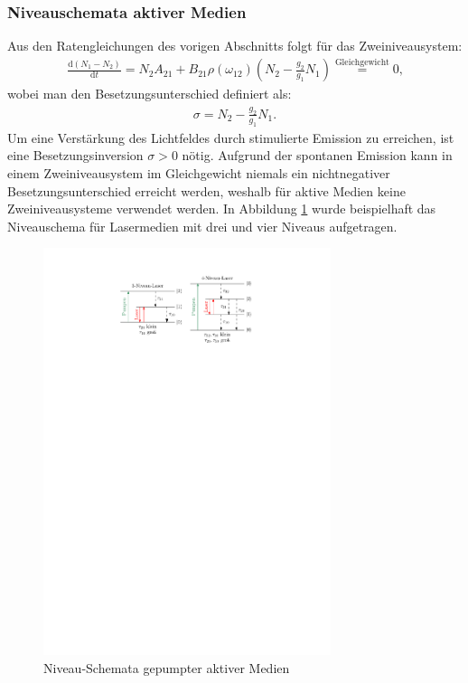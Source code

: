 \documentclass[11pt, a4paper]{article}
\numberwithin{equation}{section}
\begin{document}
\subsubsection{Niveauschemata aktiver Medien}
Aus den Ratengleichungen des vorigen Abschnitts folgt für das Zweiniveausystem:
\begin{align}
	\frac{\mathrm{d}(N_1 - N_2)}{\mathrm{d} t} = N_2 A_{21} + B_{21} \rho(\omega_{12}) \left( N_2 - \frac{g_2}{g_1} N_1 \right) \stackrel{\mathrm{Gleichgewicht}}{=} 0 \text{,}
\end{align}
wobei man den Besetzungsunterschied definiert als:
\begin{align}
	\sigma = N_2 - \frac{g_2}{g_1} N_1 \text{.}
\end{align}
Um eine Verstärkung des Lichtfeldes durch stimulierte Emission zu erreichen, ist eine Besetzungsinversion $\sigma > 0$ nötig.
Aufgrund der spontanen Emission kann in einem Zweiniveausystem im Gleichgewicht niemals ein nichtnegativer Besetzungsunterschied erreicht werden, weshalb für aktive Medien keine Zweiniveausysteme verwendet werden.
In Abbildung \ref{fig:niveauschema} wurde beispielhaft das Niveauschema für Lasermedien mit drei und vier Niveaus aufgetragen.
\begin{figure}[h]
	\centering
	\includegraphics[width=0.75\textwidth]{./figures/niveausystem_3_4.pdf}
	\caption{Niveau-Schemata gepumpter aktiver Medien}
	\label{fig:niveauschema}
\end{figure}
\end{document}
